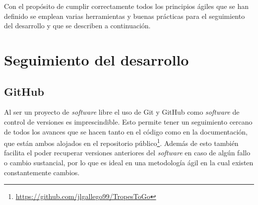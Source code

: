 Con el propósito de cumplir correctamente todos los principios ágiles que se han definido se emplean varias herramientas y buenas prácticas para el seguimiento del desarrollo y que se describen a continuación.

\section{Seguimiento del desarrollo}
\subsection{GitHub}
Al ser un proyecto de \textit{software} libre el uso de Git y GitHub como \textit{software} de control de versiones es imprescindible. Esto permite tener un seguimiento cercano de todos los avances que se hacen tanto en el código como en la documentación, que están ambos alojados en el repositorio público\footnote{\url{https://github.com/jlgallego99/TropesToGo}}. Además de esto también facilita el poder recuperar versiones anteriores del \textit{software} en caso de algún fallo o cambio sustancial, por lo que es ideal en una metodología ágil en la cual existen constantemente cambios.


